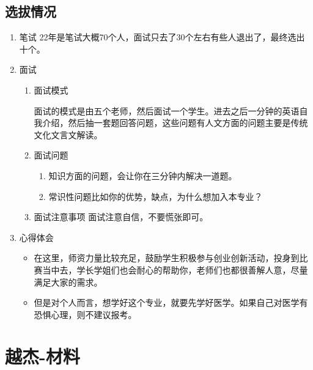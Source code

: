 \documentclass[zihao=-4,fontset=none]{Beautybook-CN}
\begin{document}
\subsection{选拔情况} 
\begin{enumerate}
	
	\item 笔试
	      22年是笔试大概70个人，面试只去了30个左右有些人退出了，最终选出十个。
	      	      	      
	\item 面试
	      \begin{enumerate}
	      	\item 面试模式
	      	      	      	      	      	          
	      	      面试的模式是由五个老师，然后面试一个学生。进去之后一分钟的英语自我介绍，然后抽一套题回答问题，这些问题有人文方面的问题主要是传统文化文言文解读。
	      	      	      	      	      	          
	      	\item 面试问题
	      	      	      	      	      	          
	      	      \begin{enumerate}
	      	      	\item 知识方面的问题，会让你在三分钟内解决一道题。
	      	      	\item 常识性问题比如你的优势，缺点，为什么想加入本专业？
	      	      \end{enumerate}
	      	      	      	      	      	          
	      	\item 面试注意事项
	      	      面试注意自信，不要慌张即可。
	      \end{enumerate}    
	      	      	      
	\item 心得体会 
	      \begin{itemize}
	      	\item 在这里，师资力量比较充足，鼓励学生积极参与创业创新活动，投身到比赛当中去，学长学姐们也会耐心的帮助你，老师们也都很善解人意，尽量满足大家的需求。
	      	\item 但是对个人而言，想学好这个专业，就要先学好医学。如果自己对医学有恐惧心理，则不建议报考。
	      \end{itemize}
\end{enumerate}
\section{越杰-材料}
\end{document}
